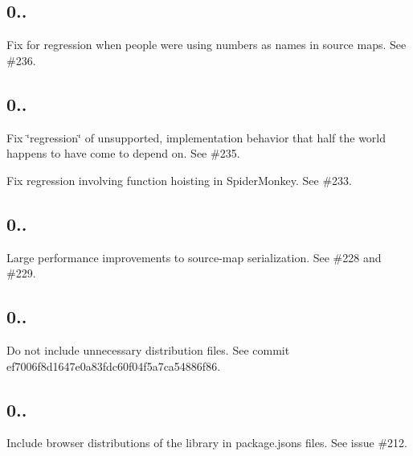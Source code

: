 \subsection*{0..}


\begin{DoxyItemize}
\item Fix for regression when people were using numbers as names in source maps. See \#236.
\end{DoxyItemize}

\subsection*{0..}


\begin{DoxyItemize}
\item Fix \char`\"{}regression\char`\"{} of unsupported, implementation behavior that half the world happens to have come to depend on. See \#235.
\item Fix regression involving function hoisting in Spider\+Monkey. See \#233.
\end{DoxyItemize}

\subsection*{0..}


\begin{DoxyItemize}
\item Large performance improvements to source-\/map serialization. See \#228 and \#229.
\end{DoxyItemize}

\subsection*{0..}


\begin{DoxyItemize}
\item Do not include unnecessary distribution files. See commit ef7006f8d1647e0a83fdc60f04f5a7ca54886f86.
\end{DoxyItemize}

\subsection*{0..}


\begin{DoxyItemize}
\item Include browser distributions of the library in package.\+json\textquotesingle{}s {\ttfamily files}. See issue \#212.
\end{DoxyItemize}

